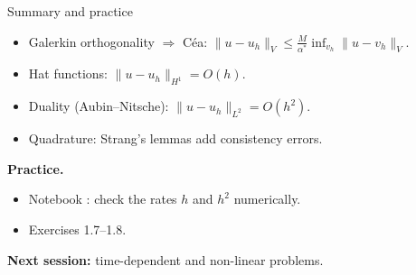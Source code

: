 \begin{frame}{Summary and practice}
    \begin{itemize}
        \item Galerkin orthogonality $\Rightarrow$ Céa: $\|u-u_h\|_V \le \frac{M}{\alpha^*} \inf_{v_h} \|u - v_h\|_V$.
        \item Hat functions: $\|u - u_h\|_{H^1} = O(h)$.
        \item Duality (Aubin--Nitsche): $\|u - u_h\|_{L^2} = O(h^2)$.
        \item Quadrature: Strang's lemmas add consistency errors.
    \end{itemize}
    \bigskip
    \textbf{Practice.}
    \begin{itemize}
        \item Notebook : check the rates $h$ and $h^2$ numerically.
        \item Exercises 1.7--1.8.
    \end{itemize}
    \bigskip
    \textbf{Next session:} time-dependent and non-linear problems.
\end{frame}
